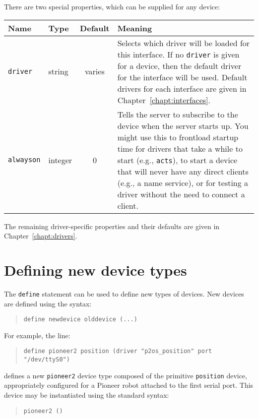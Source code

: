 \documentclass[11pt]{report}
\begin{document}
There are two special properties, which can be supplied for any device:
\begin{center}
\begin{tabularx}{\columnwidth}{|l|l|c|X|}
\hline
Name & Type & Default & Meaning\\
\hline
{\tt driver} & string & varies & 
Selects which driver will be loaded for this interface.  If no \verb+driver+
is given for a device, then the default driver for the interface will be used.
Default drivers for each interface are given in 
Chapter~\ref{chapt:interfaces}.\\
\hline
{\tt alwayson} & integer & 0 & 
Tells the server to subscribe to the device when the server starts up.
You might use this to frontload startup time for drivers that take a while to
start (e.g., {\tt acts}), to start a device that will never have any direct
clients (e.g., a name service), or for testing a driver without the need to
connect a client.\\
\hline
\end{tabularx}
\end{center}
The remaining driver-specific properties and their defaults are given in
Chapter~\ref{chapt:drivers}.

\section{Defining new device types}

The \verb'define' statement can be used to define new types of devices.
New devices are defined using the syntax:
\begin{quote}
\begin{verbatim}
define newdevice olddevice (...)
\end{verbatim}
\end{quote}
For example, the line:
\begin{quote}
\begin{verbatim}
define pioneer2 position (driver "p2os_position" port "/dev/ttyS0")
\end{verbatim}
\end{quote}
defines a new \verb'pioneer2' device type composed of the
primitive \verb'position' device, appropriately configured for a Pioneer robot
attached to the first serial port.  This device may be instantiated using the 
standard syntax:
\begin{quote}
\begin{verbatim}
pioneer2 ()
\end{verbatim}
\end{quote}
\end{document}

